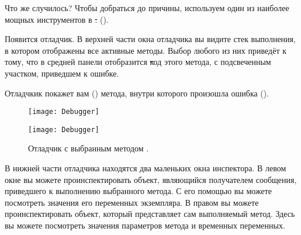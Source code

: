 \documentclass[a4paper,10pt,twoside]{book}
\begin{document}
\noindent
Что же случилось? Чтобы добраться до причины, используем один из наиболее мощных инструментов в \st:  ().


Появится отладчик.
В верхней части окна отладчика вы видите стек выполнения, в котором отображены все активные методы. Выбор любого из них приведёт к тому, что в средней панели отобразится \st код этого метода, с подсвеченным участком, приведшем к ошибке.

\dothis{Кликните на строке
\ct{LOGame>>>toggleNeighboursOfCellAt:at:} (наверху стека).}
Отладчкик покажет вам  () метода, внутри которого произошла ошибка ().

\begin{figure}[ht]
\ifluluelse
	{\centerline {\texttt{[image: Debugger]}}}
	{\centerline {\texttt{[image: Debugger]}}}
\caption{Отладчик с выбранным методом .
}
\end{figure}

В нижней части отладчика находятся два маленьких окна инспектора. В левом окне вы можете проинспектировать объект, являющийся получателем сообщения, приведшего к выполнению выбранного метода. С его помощью вы можете посмотреть значения его переменных экземпляра.
В правом вы можете проинспектировать объект, который представляет сам выполняемый метод. Здесь вы можете посмотреть значения параметров метода и временных переменных.
\end{document}
